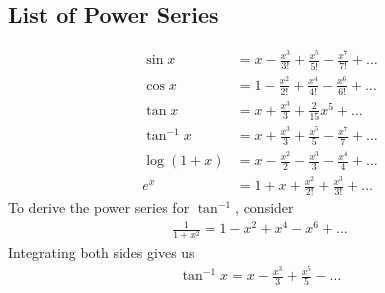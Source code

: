 \subsection{List of Power Series}
\begin{align*}
\sin x & = x -\frac{x^3}{3!} + \frac{x^5}{5!} - \frac{x^7}{7!} + \dots \\
\cos x & = 1 -\frac{x^2}{2!} + \frac{x^4}{4!} - \frac{x^6}{6!} + \dots \\
\tan x & = x + \frac{x^3}{3} + \frac{2}{15}x^5 + \dots \\
\tan^{-1} x & = x + \frac{x^3}{3} + \frac{x^5}{5} - \frac{x^7}{7} + \dots \\
\log (1+x) & = x -\frac{x^2}{2} - \frac{x^3}{3} - \frac{x^4}{4} + \dots \\
e^x & = 1 + x + \frac{x^2}{2!} + \frac{x^3}{3!} + \dots
\end{align*}
To derive the power series for $\tan^{-1}$, consider
\begin{align*}
\frac 1 {1+x^2} = 1-x^2 +x^4-x^6 + \dots
\end{align*}
Integrating both sides gives us
\begin{align*}
\tan^{-1} x = x -\frac {x^3} 3 + \frac{x^5} 5 - \dots
\end{align*}

